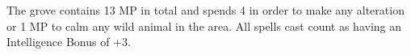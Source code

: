 \begin{multicols}{2}

The grove contains 13 MP in total and spends 4 in order to make any alteration or 1 MP to calm any wild animal in the area.
All spells cast count as having an Intelligence Bonus of +3.

\end{multicols}

